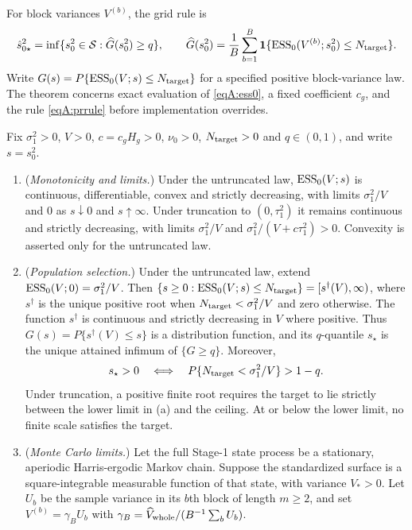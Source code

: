 For block variances $V^{(b)}$, the grid rule is
\begin{equation}
\hat s^2_{0\star}=\inf\{s_0^2\in\mathcal S:\widehat G(s_0^2)\ge q\},\qquad
\widehat G(s_0^2)=\frac1B\sum_{b=1}^B\mathbf 1\{\mathrm{ESS}_0(V^{(b)};s_0^2)\le N_{\rm target}\}.
\label{eqA:prrule}
\end{equation}
Write $G(s)=P\{\mathrm{ESS}_0(V;s)\le N_{\rm target}\}$ for a specified positive block-variance law. The theorem concerns exact evaluation of \eqref{eqA:ess0}, a fixed coefficient $c_g$, and the rule \eqref{eqA:prrule} before implementation overrides.

\begin{thmA}\label{thm:T3}
Fix $\sigma_1^2>0$, $V>0$, $c=c_gH_g>0$, $\nu_0>0$, $N_{\rm target}>0$ and $q\in(0,1)$, and write $s=s_0^2$.
\begin{enumerate}[label=(\alph*),leftmargin=2.2em]
\item (\emph{Monotonicity and limits.}) Under the untruncated law, $\mathrm{ESS}_0(V;s)$ is continuous, differentiable, convex and strictly decreasing, with limits $\sigma_1^2/V$ and $0$ as $s\downarrow0$ and $s\uparrow\infty$. Under truncation to $(0,\tau_1^2)$ it remains continuous and strictly decreasing, with limits $\sigma_1^2/V$ and $\sigma_1^2/(V+c\tau_1^2)>0$. Convexity is asserted only for the untruncated law.
\item (\emph{Population selection.}) Under the untruncated law, extend $\mathrm{ESS}_0(V;0)=\sigma_1^2/V$. Then $\{s\ge0:\mathrm{ESS}_0(V;s)\le N_{\rm target}\}=[s^\dagger(V),\infty)$, where $s^\dagger$ is the unique positive root when $N_{\rm target}<\sigma_1^2/V$ and zero otherwise. The function $s^\dagger$ is continuous and strictly decreasing in $V$ where positive. Thus $G(s)=P\{s^\dagger(V)\le s\}$ is a distribution function, and its $q$-quantile $s_\star$ is the unique attained infimum of $\{G\ge q\}$. Moreover,
\begin{equation}
s_\star>0\quad\Longleftrightarrow\quad P\{N_{\rm target}<\sigma_1^2/V\}>1-q.
\label{eq:feasible}
\end{equation}
Under truncation, a positive finite root requires the target to lie strictly between the lower limit in (a) and the ceiling. At or below the lower limit, no finite scale satisfies the target.
\item (\emph{Monte Carlo limits.}) Let the full Stage-1 state process be a stationary, aperiodic Harris-ergodic Markov chain. Suppose the standardized surface is a square-integrable measurable function of that state, with variance $V_*>0$. Let $U_b$ be the sample variance in its $b$th block of length $m\ge2$, and set $V^{(b)}=\gamma_BU_b$ with $\gamma_B=\widehat V_{\rm whole}/(B^{-1}\sum_bU_b)$.

\end{enumerate}
\end{thmA}
